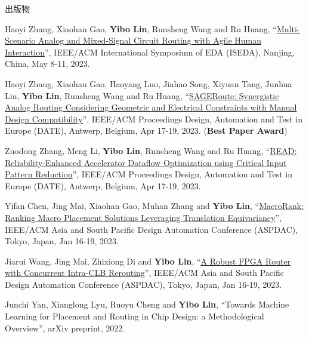 \begin{rSection}{出版物}
\begin{description}[font=\normalfont, rightmargin=2em]
{}
            

\item[{[C75]}]{
        Haoyi Zhang, Xiaohan Gao, \textbf{Yibo Lin}, Runsheng Wang and Ru Huang, 
    ``\href{https://doi.org/10.1109/ISEDA59274.2023.10218434}{Multi-Scenario Analog and Mixed-Signal Circuit Routing with Agile Human Interaction}'', 
    IEEE/ACM International Symposium of EDA (ISEDA), Nanjing, China, May 8-11, 2023.
    
}
            

\item[{[C74]}]{
        Haoyi Zhang, Xiaohan Gao, Haoyang Luo, Jiahao Song, Xiyuan Tang, Junhua Liu, \textbf{Yibo Lin}, Runsheng Wang and Ru Huang, 
    ``\href{https://doi.org/10.23919/DATE56975.2023.10137296}{SAGERoute: Synergistic Analog Routing Considering Geometric and Electrical Constraints with Manual Design Compatibility}'', 
    IEEE/ACM Proceedings Design, Automation and Test in Europe (DATE), Antwerp, Belgium, Apr 17-19, 2023.
    (\textbf{Best Paper Award})
}
            

\item[{[C73]}]{
        Zuodong Zhang, Meng Li, \textbf{Yibo Lin}, Runsheng Wang and Ru Huang, 
    ``\href{https://doi.org/10.23919/DATE56975.2023.10137254}{READ: Reliability-Enhanced Accelerator Dataflow Optimization using Critical Input Pattern Reduction}'', 
    IEEE/ACM Proceedings Design, Automation and Test in Europe (DATE), Antwerp, Belgium, Apr 17-19, 2023.
    
}
            

\item[{[C72]}]{
        Yifan Chen, Jing Mai, Xiaohan Gao, Muhan Zhang and \textbf{Yibo Lin}, 
    ``\href{https://doi.org/10.1145/3566097.3567899}{MacroRank: Ranking Macro Placement Solutions Leveraging Translation Equivariancy}'', 
    IEEE/ACM Asia and South Pacific Design Automation Conference (ASPDAC), Tokyo, Japan, Jan 16-19, 2023.
    
}
            

\item[{[C71]}]{
        Jiarui Wang, Jing Mai, Zhixiong Di and \textbf{Yibo Lin}, 
    ``\href{https://doi.org/10.1145/3566097.3567898}{A Robust FPGA Router with Concurrent Intra-CLB Rerouting}'', 
    IEEE/ACM Asia and South Pacific Design Automation Conference (ASPDAC), Tokyo, Japan, Jan 16-19, 2023.
    
}
            

\item[{[C70]}]{
        Junchi Yan, Xianglong Lyu, Ruoyu Cheng and \textbf{Yibo Lin}, 
    ``Towards Machine Learning for Placement and Routing in Chip Design: a Methodological Overview'', 
    arXiv preprint, 2022.
    
}
\end{description}
\end{rSection}
